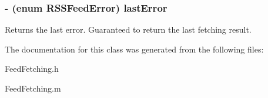 \subsubsection{\setlength{\rightskip}{0pt plus 5cm}- (enum RSSFeed\-Error) last\-Error }\label{categoryRSSFeed(Fetching)_a0}


Returns the last error. Guaranteed to return the last fetching result.

The documentation for this class was generated from the following files:\begin{CompactItemize}
\item 
Feed\-Fetching.h\item 
Feed\-Fetching.m\end{CompactItemize}
